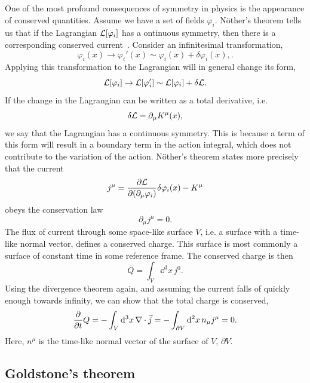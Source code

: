 One of the most profound consequences of symmetry in physics is the appearance of conserved quantities.
Assume we have a set of fields $\varphi_i$. Nöther's theorem tells us that if the Lagrangian $\mathcal{L}[\varphi_i]$ has a ontinuous symmetry, then there is a corresponding conserved current~\cite{Peskin:IntroQFT,Carroll:spacetime}.
Consider an infinitesimal transformation,
\begin{equation*}
    \varphi_i(x) \longrightarrow \varphi_i'(x)
    \sim \varphi_i(x) + \delta \varphi_i(x),.
\end{equation*}
Applying this transformation to the Lagrangian will in general change its form,
\begin{equation*}
    \mathcal{L}[\varphi_i] \rightarrow \mathcal{L}[\varphi_i']
    \sim \mathcal{L}[\varphi_i] + \delta \mathcal{L}.
\end{equation*}
If the change in the Lagrangian can be written as a total derivative, i.e.
\begin{equation*}
    \delta \mathcal{L} = \partial_\mu K^\mu(x),
\end{equation*}
we say that the Lagrangian has a continuous symmetry.
This is because a term of this form will result in a boundary term in the action integral, which does not contribute to the variation of the action.
Nöther's theorem states more precisely that the current
\begin{equation}
    j^\mu = \pdv{\mathcal{L}}{(\partial_\mu \varphi_i)} \delta \varphi_i(x) - K^\mu
\end{equation}
obeys the conservation law
\begin{equation}
    \partial_\mu j^\mu = 0.
\end{equation}
The flux of current through some space-like surface $V$, i.e. a surface with a time-like normal vector, defines a conserved charge. This surface is most commonly a surface of constant time in some reference frame. The conserved charge is then
\begin{equation*}
    Q = \int_V \dd^3 x \, j^0.
\end{equation*} 
Using the divergence theorem again, and assuming the current falls of quickly enough towards infinity, we can show that the total charge is conserved,
\begin{equation*}
    \pdv{t} Q = - \int_V \dd^3 x \, \nabla \cdot \vec j = - \int_{\partial V} \dd^2 x\, n_\mu j^\mu = 0.
\end{equation*}
Here, $n^\mu$ is the time-like normal vector of the surface of $V$, $\partial V$.


\subsection*{Goldstone's theorem}

